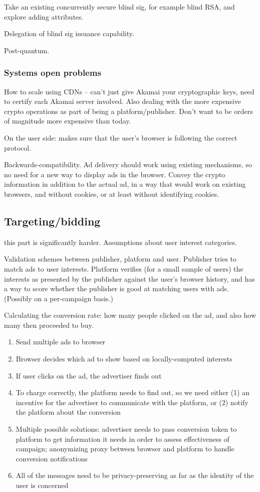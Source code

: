 Take an existing concurrently secure blind sig, for example blind RSA, and explore adding attributes.

Delegation of blind sig issuance capability.

Post-quantum.

\subsubsection{Systems open problems}
How to scale using CDNs -- can't just give Akamai your cryptographic keys, need to certify each Akamai server involved. Also dealing with the more expensive crypto operations as part of being a platform/publisher.  Don't want to be orders of magnitude more expensive than today.

On the user side: makes sure that the user's browser is following the correct protocol.

Backwards-compatibility.  Ad delivery should work using existing mechanisms, so no need for a new way to display ads in the browser.
Convey the crypto information in addition to the actual ad, in a way that would work on existing browsers, and without cookies, or at least without identifying cookies.



\subsection{Targeting/bidding}
\label{r:matching}

this part is significantly harder.  Assumptions about user interest categories.

Validation schemes between publisher, platform and user.  Publisher tries to match ads to user interests.  Platform verifies (for a small sample of users) the interests as presented by the publisher against the user's browser history, and has a way to score whether the publisher is good at matching users with ads.  (Possibly on a per-campaign basis.)

Calculating the conversion rate: how many people clicked on the ad, and also how many then proceeded to buy.

\begin{enumerate}
\item Send multiple ads to browser
\item Browser decides which ad to show based on locally-computed interests
\item If user clicks on the ad, the advertiser finds out
\item To charge correctly, the platform needs to find out, so we need either (1) an incentive for the advertiser to communicate with the platform, or (2) notify the platform about the conversion
\item Multiple possible solutions: advertiser needs to pass conversion token to platform to get information it needs in order to assess effectiveness of campaign; anonymizing proxy between browser and platform to handle conversion notifications
\item All of the messages need to be privacy-preserving as far as the identity of the user is concerned
\end{enumerate}
